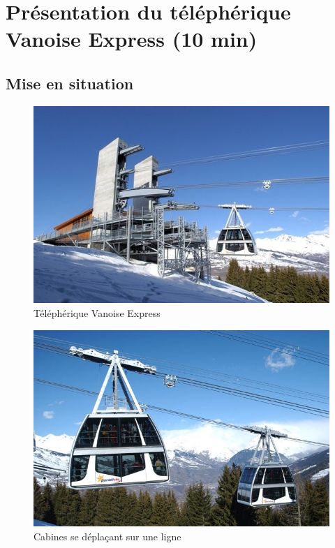 

\section{Présentation du téléphérique Vanoise Express (10 min)}

\subsection{Mise en situation}

\begin{figure}[!h]
\centering
\includegraphics[width=0.8\linewidth]{img/fig01}
\caption{Téléphérique Vanoise Express}
\label{fig01}
\end{figure}

\begin{figure}
	\vspace{-20pt}
	\centering \includegraphics[width=0.9\linewidth]{img/fig02}
	\caption{Cabines se déplaçant sur une ligne}
	\label{fig02}
\end{figure}


